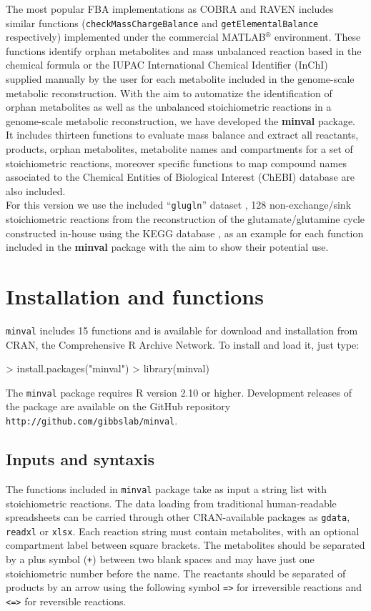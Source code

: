 The most popular FBA implementations as COBRA and RAVEN includes similar functions (\texttt{checkMassChargeBalance} and \texttt{getElementalBalance} respectively) implemented under the commercial MATLAB$^{\circledR}$ environment. These functions identify orphan metabolites and mass unbalanced reaction based in the chemical formula or the IUPAC International Chemical Identifier (InChI) supplied manually by the user for each metabolite included in the genome-scale metabolic reconstruction. With the aim to automatize the identification of orphan metabolites as well as the unbalanced stoichiometric reactions in a genome-scale metabolic reconstruction, we have developed the \textbf{minval} package. It includes thirteen functions to evaluate mass balance and extract all reactants, products, orphan metabolites, metabolite names and compartments for a set of stoichiometric reactions, moreover specific functions to map compound names associated to the Chemical Entities of Biological Interest (ChEBI) database are also included.\\

For this version we use the included ``\texttt{glugln}'' dataset \cite{NelsonE.2015}, 128 non-exchange/sink stoichiometric reactions from the reconstruction of the glutamate/glutamine cycle constructed in-house using the KEGG database , as an example for each function included in the \textbf{minval} package with the aim to show their potential use.

\section{Installation and functions}
\texttt{minval} includes 15 functions and is available for download and installation from CRAN, the
Comprehensive R Archive Network. To install and load it, just type:
\begin{Schunk}
\begin{Sinput}
> install.packages("minval")
> library(minval)
\end{Sinput}
\end{Schunk}
The \texttt{minval} package requires R version 2.10 or higher. Development releases of the package are available on the GitHub repository \texttt{http://github.com/gibbslab/minval}.

\subsection*{Inputs and syntaxis}
The functions included in \texttt{minval} package take as input a string list with stoichiometric reactions. The data loading from traditional human-readable spreadsheets can be carried through other CRAN-available packages as \texttt{gdata}, \texttt{readxl} or \texttt{xlsx}. Each reaction string must contain metabolites, with an optional compartment label between square brackets. The metabolites should be separated by a plus symbol (\texttt{+}) between two blank spaces and may have just one stoichiometric number before the name. The reactants should be separated of products by an arrow using the following symbol \texttt{=>} for irreversible reactions and \texttt{<=>} for reversible reactions.
